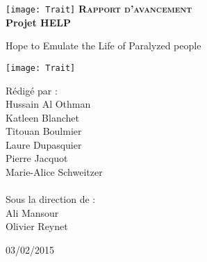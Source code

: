 \begingroup
\thispagestyle{empty}
\begin{center}
\vspace*{5.5cm}
\texttt{[image: Trait]}
{\Huge \textsc{\textbf{Rapport d'avancement}}}\\
\vspace*{1cm}
{\Huge \textbf{Projet HELP}}\par %
\vspace*{1cm}
{\huge Hope to Emulate the Life of Paralyzed people}\par %
\texttt{[image: Trait]}
\end{center}
\vspace*{1.3cm}

\begin{multicols}{2}
{\setlength{\baselineskip}{1.5\baselineskip}
{\Large Rédigé par :\\
Hussain Al Othman\\
Katleen Blanchet\\
Titouan Boulmier\\
Laure Dupasquier\\
Pierre Jacquot\\
Marie-Alice Schweitzer\\
\columnbreak\\
\hspace*{1cm}
Sous la direction de :\\
\hspace*{1cm}
Ali Mansour\\
\hspace*{1cm}
Olivier Reynet\\}
\par}
\end{multicols}

\vspace*{1cm}
\begin{center}
\large
03/02/2015
\end{center}


\endgroup
